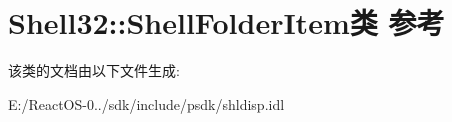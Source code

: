 \hypertarget{class_shell32_1_1_shell_folder_item}{}\section{Shell32\+:\+:Shell\+Folder\+Item类 参考}
\label{class_shell32_1_1_shell_folder_item}


该类的文档由以下文件生成\+:\begin{DoxyCompactItemize}
\item 
E\+:/\+React\+O\+S-\/0../sdk/include/psdk/shldisp.\+idl\end{DoxyCompactItemize}

